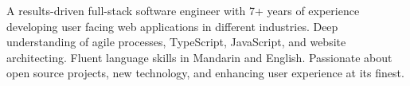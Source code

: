 

\begin{cvparagraph}

  A results-driven full-stack software engineer with 7+ years of experience developing user facing web applications in different industries.
  Deep understanding of agile processes, TypeScript, JavaScript, and website architecting. Fluent language skills in Mandarin and English.
  Passionate about open source projects, new technology, and enhancing user experience at its finest.

\end{cvparagraph}
